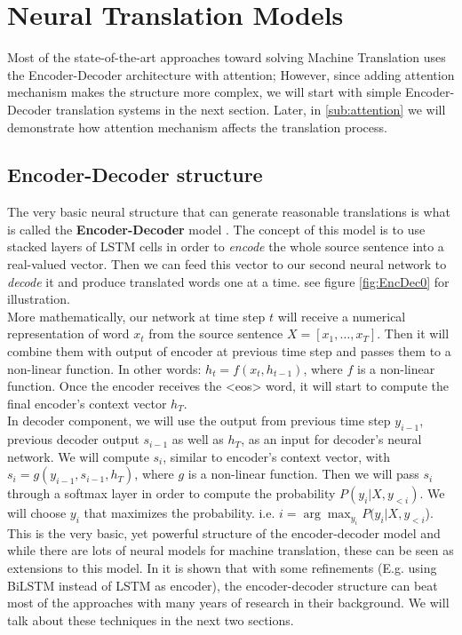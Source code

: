 \documentclass{sfuthesis}
\begin{document}
\section{Neural Translation Models} \label{sec:NTM}
Most of the state-of-the-art approaches toward solving Machine Translation uses the Encoder-Decoder architecture with attention; However, since adding attention mechanism makes the structure more complex, we will start with simple Encoder-Decoder translation systems in the next section. Later, in \ref{sub:attention} we will demonstrate how attention mechanism affects the translation process.
\subsection{Encoder-Decoder structure} \label{sub:EncDec}
The very basic neural structure that can generate reasonable translations is what is called the \textbf{Encoder-Decoder} model \cite{Chrisman:1991:EncDec, Sutskever:2014:NIPS}. The concept of this model is to use stacked layers of LSTM cells in order to \emph{encode} the whole source sentence into a real-valued vector. Then we can feed this vector to our second neural network to \emph{decode} it and produce translated words one at a time. see figure \ref{fig:EncDec0} for illustration.\\
More mathematically, our network at time step $t$ will receive a numerical representation of word $x_t$ from the source sentence $X = [x_1, \dots, x_T]$. Then it will combine them with output of encoder at previous time step and passes them to a non-linear function. In other words: $h_t = f(x_t, h_{t-1})$, where $f$ is a non-linear function. Once the encoder receives the <eos> word, it will start to compute the final encoder's context vector $h_T$.\\
In decoder component, we will use the output from previous time step $y_{i-1}$, previous decoder output $s_{i-1}$ as well as $h_T$, as an input for decoder's neural network. We will compute $s_{i}$, similar to encoder's context vector, with $s_{i} = g(y_{i-1}, s_{i-1}, h_{T})$, where $g$ is a non-linear function. Then we will pass $s_i$ through a softmax layer in order to compute the probability $P(y_i | X, y_{<i})$.  We will choose $y_i$ that maximizes the probability. i.e. $i = \arg\max_{y_i} P(y_i | X, y_{<i}$).\\
This is the very basic, yet powerful structure of the encoder-decoder model and while there are lots of neural models for machine translation, these can be seen as extensions to this model. In \cite{Sutskever:2014:NIPS} it is shown that with some refinements (E.g. using BiLSTM instead of LSTM as encoder), the encoder-decoder structure can beat most of the approaches with many years of research in their background. We will talk about these techniques in the next two sections.
\end{document}
